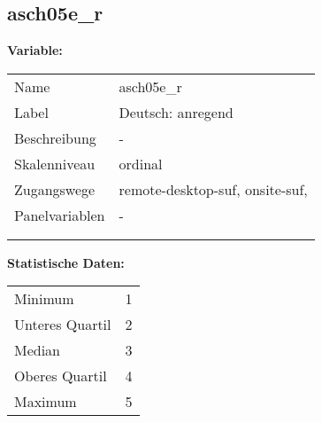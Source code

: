 	
	
	\subsection{asch05e\_r}
	\label{subSection:asch05e_r}

	\noindent\textbf{Variable:}\\
		\begin{tabular}{lL{11.3cm}}
			\label{tableVariable:asch05e_r}
			Name & asch05e\_r \\
			Label & Deutsch: anregend \\
			Beschreibung & - \\
			Skalenniveau & ordinal \\
			Zugangswege &
				remote-desktop-suf,
				onsite-suf,
 \\
			Panelvariablen & -
			 \\
			 \\
 \\
		\end{tabular}



		\vspace*{1 cm}
		\noindent\textbf{Statistische Daten:}\\
			\begin{tabular}{ll}
				\label{tableStatistics:asch05e_r}
					Minimum & 1 \\
					Unteres Quartil & 2 \\
					Median & 3 \\
					Oberes Quartil & 4 \\
					Maximum & 5 \\
			\end{tabular}



